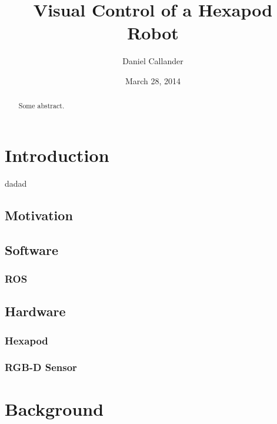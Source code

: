 \documentclass{l4proj}
\begin{document}


\title{Visual Control of a Hexapod Robot}
\author{Daniel Callander}
\date{March 28, 2014}
\maketitle

\begin{abstract}
Some abstract.
\end{abstract}

\educationalconsent
\tableofcontents


\chapter{Introduction}
dadad
\section{Motivation}
\section{Software}
\subsection{ROS}

\section{Hardware}
\subsection{Hexapod}
\subsection{RGB-D Sensor}


\chapter{Background}
\end{document}
